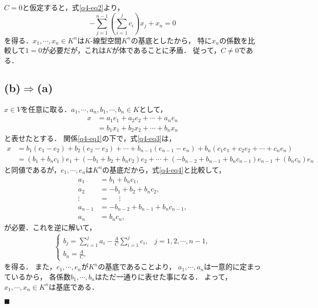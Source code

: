 \documentclass[uplatex, 12pt, dvipdfmx]{jsarticle}
\begin{document}
$C=0$と仮定すると，式\ref{q4-eq2}より，
\[ -\sum^{n-1}_{j=1}\left(\sum^j_{i=1}c_i\right)x_j+x_n=0 \]
を得る．$x_1,\cdots,x_n\in K^n$は$K$-線型空間$K^n$の基底としたから，
特に$x_n$の係数を比較して$1=0$が必要だが，これは$K$が体であることに矛盾．
従って，$C\ne 0$である．

\subsection*{(b)$\Rightarrow$(a)}

$x\in V$を任意に取る．$a_1,\cdots,a_n,b_1,\cdots,b_n\in K$として，
\begin{align}
    x&=a_1e_1+a_2e_2+\cdots+a_ne_n\label{q4-eq4}\\
    &=b_1x_1+b_2x_2+\cdots+b_nx_n\label{q4-eq3}
\end{align}
と表せたとする．
関係\ref{q4-eq1}の下で，式\ref{q4-eq3}は，
\begin{align*}
    x&=b_1(e_1-e_2) + b_2(e_2-e_3) + \cdots + b_{n-1}(e_{n-1}-e_n) + b_n(c_1e_1+c_2e_2+\cdots+c_ne_n)\\
    &=(b_1+b_nc_1)e_1 + (-b_1+b_2+b_nc_2)e_2 + \cdots + (-b_{n-2}+b_{n-1}+b_nc_{n-1})e_{n-1}  + (b_nc_n)e_n
\end{align*}
と同値であるが，$e_1,\cdots,e_n$は$K^n$の基底だから，式\ref{q4-eq4}と比較して，
\begin{align*}
    a_1 &= b_1+b_nc_1,\\
    a_2 &= -b_1+b_2+b_nc_2,\\
    \vdots\;\;&=\;\;\;\;\;\vdots\\
    a_{n-1} &= -b_{n-2}+b_{n-1}+b_nc_{n-1},\\
    a_n&=b_nc_n,
\end{align*}
が必要．これを逆に解いて，
\begin{align*}
    \begin{cases}
        b_j=\sum^j_{i=1}a_i-\frac{A}{C}\sum^j_{i=1}c_i,&j=1,2,\cdots,n-1,\\
        b_n=\frac{A}{C},
    \end{cases}
\end{align*}
を得る．
また，$e_1,\cdots,e_n$が$K^n$の基底であることより，
$a_1,\cdots,a_n$は一意的に定まっているから，
各係数$b_1,\cdots,b_n$はただ一通りに表せた事になる．
よって，$x_1,\cdots,x_n\in K^n$は基底である．
\begin{flushright}$\blacksquare$\end{flushright}
\end{document}

